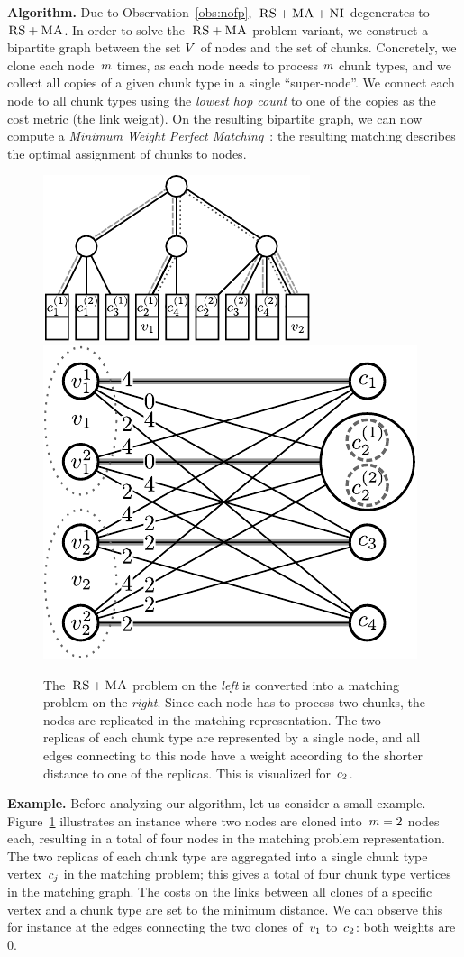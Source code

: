 \textbf{Algorithm.} Due to Observation~\ref{obs:nofp},~$\textsc{RS}+\textsc{MA}+\textsc{NI}$ degenerates to~$\textsc{RS}+\textsc{MA}$.
In order to solve the~$\textsc{RS}+\textsc{MA}$ problem variant,
we construct a bipartite
graph between the set
$V$ of nodes and
the set of chunks.
Concretely, we clone each node~$m$ times,
as each node needs to process
$m$ chunk types, and we collect all copies of a given chunk type in a
single %
``super-node''. We connect each node to all chunk types using the
\emph{lowest hop count} to one of the copies as the cost metric (the link weight).
On the resulting bipartite graph, we can now compute a \emph{Minimum Weight
Perfect
Matching}~\cite{gabow_scaling_algorithm}:
the resulting matching describes the optimal assignment of chunks to nodes.
\begin{figure}
\includegraphics[width = 0.49\columnwidth]{figs/static-mapping/model_ma_r_cv_boxes}
\hfill
\includegraphics[width =0.49\columnwidth]{figs/static-mapping/matching}
\caption{The~$\textsc{RS}+\textsc{MA}$ problem on the \emph{left} is converted into a
matching problem on the \emph{right}. Since each node has to process two
chunks, the
nodes are replicated in the matching representation. The two replicas of each
chunk type are represented by a single node, and all edges connecting to this
node have a weight according to the shorter distance to one of the replicas.
This is visualized for~$c_2$.}
\label{fig:matching}
\end{figure}

\textbf{Example.} Before analyzing our algorithm, let us consider a small example.
Figure~\ref{fig:matching} illustrates
an instance where two nodes are
cloned into~$m = 2$ nodes each,
resulting in a total of four nodes in
the matching problem representation.
The two replicas of each chunk type are
aggregated into a single chunk type vertex~$c_j$  in the matching problem;
this gives a total of four chunk type vertices in the matching graph. The costs
on the links between all clones of a specific vertex and a chunk type are set to
the minimum distance. We can observe this for instance at the edges connecting
the two clones of~$v_1$ to~$c_2$: both weights are 0.

